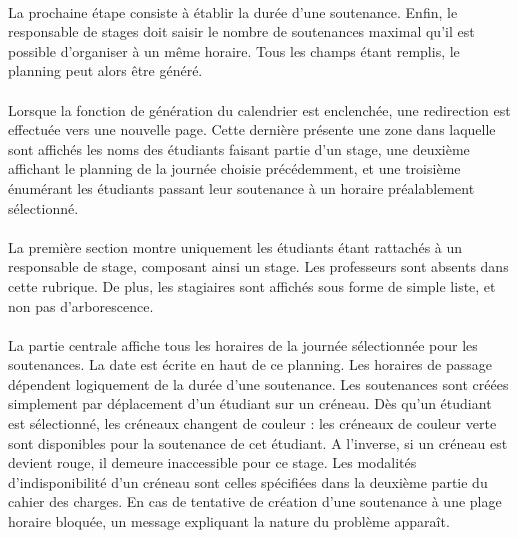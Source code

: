 \documentclass[a4paper,10pt]{report}
\begin{document}
	      \paragraph{}
		La prochaine étape consiste à établir la durée d'une soutenance.
		Enfin, le responsable de stages doit saisir le nombre de soutenances maximal qu'il est possible d'organiser à un même horaire.
		Tous les champs étant remplis, le planning peut alors être généré.
		
	      \paragraph{}
		Lorsque la fonction de génération du calendrier est enclenchée, une redirection est effectuée vers une nouvelle page.
		Cette dernière présente une zone dans laquelle sont affichés les noms des étudiants faisant partie d'un stage, une deuxième affichant le planning de la journée choisie précédemment, et une troisième énumérant les étudiants passant leur soutenance à un horaire préalablement sélectionné.
		
	      \paragraph{}
		La première section montre uniquement les étudiants étant rattachés à un responsable de stage, composant ainsi un stage.
		Les professeurs sont absents dans cette rubrique. De plus, les stagiaires sont affichés sous forme de simple liste, et non pas d'arborescence.
		
	      \paragraph{}
		La partie centrale affiche tous les horaires de la journée sélectionnée pour les soutenances.
		La date est écrite en haut de ce planning.
		Les horaires de passage dépendent logiquement de la durée d'une soutenance.
		Les soutenances sont créées simplement par déplacement d'un étudiant sur un créneau.
		Dès qu'un étudiant est sélectionné, les créneaux changent de couleur : les créneaux de couleur verte sont disponibles pour la soutenance de cet étudiant.
		A l'inverse, si un créneau est devient rouge, il demeure inaccessible pour ce stage.
		Les modalités d'indisponibilité d'un créneau sont celles spécifiées dans la deuxième partie du cahier des charges.
		En cas de tentative de création d'une soutenance à une plage horaire bloquée, un message expliquant la nature du problème apparaît.
		
\end{document}
